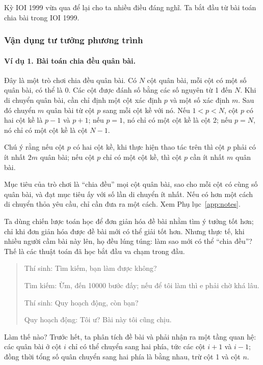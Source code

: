 \documentclass[11pt]{article}
\begin{document}
Kỳ IOI 1999 vừa qua để lại cho ta nhiều điều đáng nghĩ. Ta bắt đầu từ bài
toán chia bài trong IOI 1999.

\subsubsection{Vận dụng tư tưởng phương trình}

\paragraph{Ví dụ 1. Bài toán chia đều quân bài.}
Đây là một trò chơi chia đều quân bài. Có \(N\) cột quân bài, mỗi cột có một
số quân bài, có thể là 0. Các cột được đánh số bằng các số nguyên từ 1 đến
\(N\). Khi di chuyển quân bài, cần chỉ định một cột xác định \(p\) và một số
xác định \(m\). Sau đó chuyển \(m\) quân bài từ cột \(p\) sang mỗi cột kề
với nó. Nếu \(1<p<N\), cột \(p\) có hai cột kề là \(p-1\) và \(p+1\); nếu
\(p=1\), nó chỉ có một cột kề là cột 2; nếu \(p=N\), nó chỉ có một cột kề là
cột \(N-1\).

Chú ý rằng nếu cột \(p\) có hai cột kề, khi thực hiện thao tác trên thì cột
\(p\) phải có ít nhất \(2m\) quân bài; nếu cột \(p\) chỉ có một cột kề, thì
cột \(p\) cần ít nhất \(m\) quân bài.

Mục tiêu của trò chơi là ``chia đều'' mọi cột quân bài, sao cho mỗi cột có
cùng số quân bài, và đạt mục tiêu ấy với số lần di chuyển ít nhất. Nếu có hơn
một cách di chuyển thỏa yêu cầu, chỉ cần đưa ra một cách. Xem
Phụ lục~\ref{app:notes}.

Ta dùng chiến lược toán học để đơn giản hóa đề bài nhằm tìm ý tưởng tốt hơn;
chỉ khi đơn giản hóa được đề bài mới có thể giải tốt hơn. Nhưng thực tế, khi
nhiều người cầm bài này lên, họ đều lúng túng: làm sao mới có thể ``chia
đều''? Thế là các thuật toán đã học bắt đầu va chạm trong đầu.

\begin{quote}
Thí sinh: Tìm kiếm, bạn làm được không?

Tìm kiếm: Ừm, đến 10000 bước đấy; nếu để tôi làm thì e phải chờ khá lâu.

Thí sinh: Quy hoạch động, còn bạn?

Quy hoạch động: Tôi ư? Bài này tôi cũng chịu.
\end{quote}

Làm thế nào? Trước hết, ta phân tích đề bài và phải nhận ra một tầng quan hệ:
các quân bài ở cột \(i\) chỉ có thể chuyển sang hai phía, tức các cột \(i+1\)
và \(i-1\); đồng thời tổng số quân chuyển sang hai phía là bằng nhau, trừ cột
1 và cột \(n\).
\end{document}
